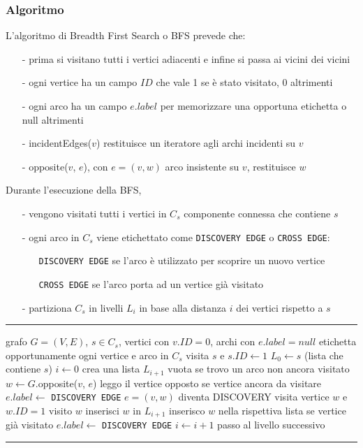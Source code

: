 \documentclass[a4paper]{article}
\makeatletter
\newenvironment{algo}[4]{
	\noindent\rule{\textwidth}{0.4pt}
	\begin{algorithmic}[1]
		\addtocounter{ALG@line}{-1}
		\Procedure{#1}{#2}
		\Require #3
		\Ensure #4
		\Statex }{
		\EndProcedure
	\end{algorithmic}
	\rule{\textwidth}{0.4pt}}
\makeatother
\begin{document}
\subsubsection*{Algoritmo}
L'algoritmo di Breadth First Search o BFS prevede che:
\begin{itemize}[topsep=3pt, itemsep=0pt]
	\item[-] prima si visitano tutti i vertici adiacenti e infine si passa ai vicini dei vicini
	\item[-] ogni vertice ha un campo \(I\!D\) che vale 1 se è stato visitato, 0 altrimenti
	\item[-] ogni arco ha un campo \(e.label\) per memorizzare una opportuna etichetta o null altrimenti
	\item[-] incidentEdges(\(v\)) restituisce un iteratore agli archi incidenti su \(v\)
	\item[-] opposite(\(v\), \(e\)), con \(e = (v,w)\) arco insistente su \(v\), restituisce \(w\)
\end{itemize}
Durante l'esecuzione della BFS,
\begin{itemize}[topsep=3pt, itemsep=0pt]
	\item[-] vengono visitati tutti i vertici in \(C_s\) componente connessa che contiene \(s\)
	\item[-] ogni arco in \(C_s\) viene etichettato come \verb|DISCOVERY EDGE| o \verb|CROSS EDGE|:
	\begin{itemize}[topsep=0pt, itemsep=0pt]
		\item[] \verb|DISCOVERY EDGE| se l'arco è utilizzato per scoprire un nuovo vertice
		\item[] \verb|CROSS EDGE| se l'arco porta ad un vertice già visitato
	\end{itemize}
	\item[-] partiziona \(C_s\) in livelli \(L_i\) in base alla distanza \(i\) dei vertici rispetto a \(s\)
\end{itemize}

\begin{algo}{BFS}{$G$, $s$}{grafo $G = (V,E)$, $s \in C_s$, vertici con \(v.I\!D = 0\), archi con \(e.label = null\)}{etichetta opportunamente ogni vertice e arco in \(C_s\)}
	\State visita \(s\) e \(s.I\!D \gets 1\)
	\State \(L_0 \gets s\) (lista che contiene \(s\))
	\State \(i \gets 0\)
		\State crea una lista \(L_{i+1}\) vuota
				 \Comment se trovo un arco non ancora visitato
					\State \(w \gets G\).opposite(\(v\), \(e\)) \Comment leggo il vertice opposto
					 \Comment se vertice ancora da visitare
						\State \(e.label \gets\) \verb|DISCOVERY EDGE| \Comment \(e = (v,w)\) diventa DISCOVERY
						\State visita vertice \(w\) e \(w.I\!D = 1\) \Comment visito \(w\)
						\State inserisci \(w\) in \(L_{i+1}\) \Comment inserisco \(w\) nella rispettiva lista
					\Else \Comment se vertice già visitato
						\State \(e.label \gets\) \verb|DISCOVERY EDGE|
					\EndIf
				\EndIf
			\EndFor
		\EndFor
		\State \(i \gets i+1\) \Comment passo al livello successivo
	\EndWhile
\end{algo}
\end{document}
